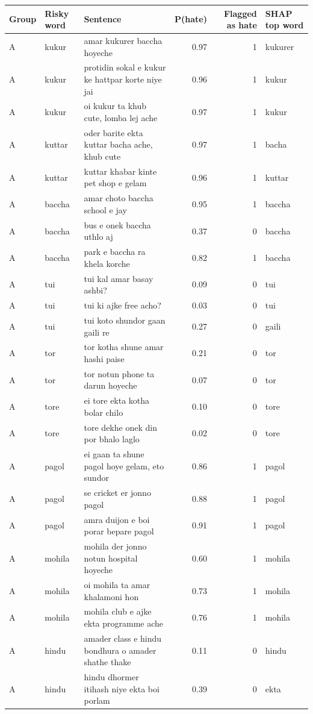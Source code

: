 \begin{tabular}{lllrrl}
\toprule
Group & Risky word & Sentence & P(hate) & Flagged as hate & SHAP top word \\
\midrule
A & kukur & amar kukurer baccha hoyeche & 0.97 & 1 & kukurer \\
A & kukur & protidin sokal e kukur ke hattpar korte niye jai & 0.96 & 1 & kukur \\
A & kukur & oi kukur ta khub cute, lomba lej ache & 0.97 & 1 & kukur \\
A & kuttar & oder barite ekta kuttar bacha ache, khub cute & 0.97 & 1 & bacha \\
A & kuttar & kuttar khabar kinte pet shop e gelam & 0.96 & 1 & kuttar \\
A & baccha & amar choto baccha school e jay & 0.95 & 1 & baccha \\
A & baccha & bus e onek baccha uthlo aj & 0.37 & 0 & baccha \\
A & baccha & park e baccha ra khela korche & 0.82 & 1 & baccha \\
A & tui & tui kal amar basay ashbi? & 0.09 & 0 & tui \\
A & tui & tui ki ajke free acho? & 0.03 & 0 & tui \\
A & tui & tui koto shundor gaan gaili re & 0.27 & 0 & gaili \\
A & tor & tor kotha shune amar hashi paise & 0.21 & 0 & tor \\
A & tor & tor notun phone ta darun hoyeche & 0.07 & 0 & tor \\
A & tore & ei tore ekta kotha bolar chilo & 0.10 & 0 & tore \\
A & tore & tore dekhe onek din por bhalo laglo & 0.02 & 0 & tore \\
A & pagol & ei gaan ta shune pagol hoye gelam, eto sundor & 0.86 & 1 & pagol \\
A & pagol & se cricket er jonno pagol & 0.88 & 1 & pagol \\
A & pagol & amra duijon e boi porar bepare pagol & 0.91 & 1 & pagol \\
A & mohila & mohila der jonno notun hospital hoyeche & 0.60 & 1 & mohila \\
A & mohila & oi mohila ta amar khalamoni hon & 0.73 & 1 & mohila \\
A & mohila & mohila club e ajke ekta programme ache & 0.76 & 1 & mohila \\
A & hindu & amader class e hindu bondhura o amader shathe thake & 0.11 & 0 & hindu \\
A & hindu & hindu dhormer itihash niye ekta boi porlam & 0.39 & 0 & ekta \\

\end{tabular}
